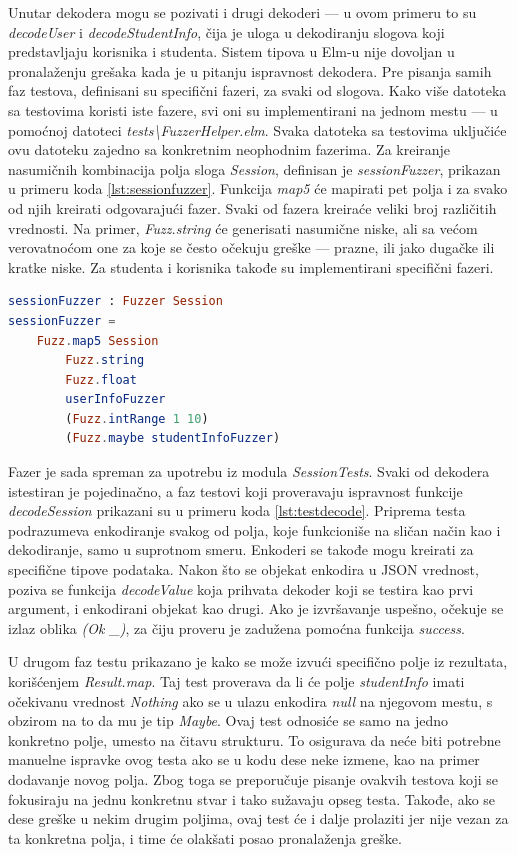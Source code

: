 \documentclass[12pt,oneside]{memoir}
\begin{document}
\par Unutar dekodera mogu se pozivati i drugi dekoderi --- u ovom primeru to su \emph{decodeUser} i \emph{decodeStudentInfo}, čija je uloga u dekodiranju slogova koji predstavljaju korisnika i studenta. Sistem tipova u Elm-u nije dovoljan u pronalaženju grešaka kada je u pitanju ispravnost dekodera. Pre pisanja samih faz testova, definisani su specifični fazeri, za svaki od slogova. Kako više datoteka sa testovima koristi iste fazere, svi oni su implementirani na jednom mestu --- u pomoćnoj datoteci \emph{tests{\textbackslash}FuzzerHelper.elm}. Svaka datoteka sa testovima uključiće ovu datoteku zajedno sa konkretnim neophodnim fazerima. Za kreiranje nasumičnih kombinacija polja sloga \emph{Session}, definisan je \emph{sessionFuzzer}, prikazan u primeru koda \ref{lst:sessionfuzzer}. Funkcija \emph{map5} će mapirati pet polja i za svako od njih kreirati odgovarajući fazer. Svaki od fazera kreiraće veliki broj različitih vrednosti. Na primer, \emph{Fuzz.string} će generisati nasumične niske, ali sa većom verovatnoćom one za koje se često očekuju greške --- prazne, ili jako dugačke ili kratke niske. Za studenta i korisnika takođe su implementirani specifični fazeri.

\begin{lstlisting}[language=elm, caption={Implementacija fazera za slog \emph{Session}},captionpos=b, label={lst:sessionfuzzer}]
sessionFuzzer : Fuzzer Session
sessionFuzzer = 
    Fuzz.map5 Session
        Fuzz.string
        Fuzz.float
        userInfoFuzzer
        (Fuzz.intRange 1 10)
        (Fuzz.maybe studentInfoFuzzer)
\end{lstlisting} 

\par Fazer je sada spreman za upotrebu iz modula \emph{SessionTests}. Svaki od dekodera istestiran je pojedinačno, a faz testovi koji proveravaju ispravnost funkcije \emph{decodeSession} prikazani su u primeru koda \ref{lst:testdecode}. Priprema testa podrazumeva enkodiranje svakog od polja, koje funkcioniše na sličan način kao i dekodiranje, samo u suprotnom smeru. Enkoderi se takođe mogu kreirati za specifične tipove podataka. Nakon što se objekat enkodira u JSON vrednost, poziva se funkcija \emph{decodeValue} koja prihvata dekoder koji se testira kao prvi argument, i enkodirani objekat kao drugi. Ako je izvršavanje uspešno, očekuje se izlaz oblika \emph{(Ok \_)}, za čiju proveru je zadužena pomoćna funkcija \emph{success}. 
\par U drugom faz testu prikazano je kako se može izvući specifično polje iz rezultata, korišćenjem \emph{Result.map}. Taj test proverava da li će polje \emph{studentInfo} imati očekivanu vrednost \emph{Nothing} ako se u ulazu enkodira \emph{null} na njegovom mestu, s obzirom na to da mu je tip \emph{Maybe}. Ovaj test odnosiće se samo na jedno konkretno polje, umesto na čitavu strukturu. To osigurava da neće biti potrebne manuelne ispravke ovog testa ako se u kodu dese neke izmene, kao na primer dodavanje novog polja. Zbog toga se preporučuje pisanje ovakvih testova koji se fokusiraju na jednu konkretnu stvar i tako sužavaju opseg testa. Takođe, ako se dese greške u nekim drugim poljima, ovaj test će i dalje prolaziti jer nije vezan za ta konkretna polja, i time će olakšati posao pronalaženja greške.
\end{document}
